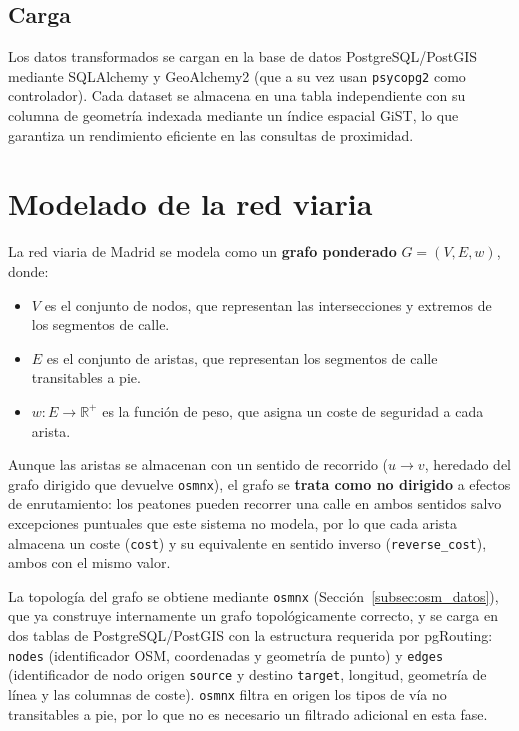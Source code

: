\subsection{Carga}
\label{subsec:carga}

Los datos transformados se cargan en la base de datos PostgreSQL/PostGIS mediante SQLAlchemy y GeoAlchemy2 (que a su vez usan \texttt{psycopg2} como controlador). Cada dataset se almacena en una tabla independiente con su columna de geometría indexada mediante un índice espacial GiST, lo que garantiza un rendimiento eficiente en las consultas de proximidad.

\section{Modelado de la red viaria}
\label{sec:modelado_red}

La red viaria de Madrid se modela como un \textbf{grafo ponderado} $G = (V, E, w)$, donde:

\begin{itemize}
    \item $V$ es el conjunto de nodos, que representan las intersecciones y extremos de los segmentos de calle.
    \item $E$ es el conjunto de aristas, que representan los segmentos de calle transitables a pie.
    \item $w: E \rightarrow \mathbb{R}^+$ es la función de peso, que asigna un coste de seguridad a cada arista.
\end{itemize}

Aunque las aristas se almacenan con un sentido de recorrido ($u \rightarrow v$, heredado del grafo dirigido que devuelve \texttt{osmnx}), el grafo se \textbf{trata como no dirigido} a efectos de enrutamiento: los peatones pueden recorrer una calle en ambos sentidos salvo excepciones puntuales que este sistema no modela, por lo que cada arista almacena un coste (\texttt{cost}) y su equivalente en sentido inverso (\texttt{reverse\_cost}), ambos con el mismo valor.

La topología del grafo se obtiene mediante \texttt{osmnx} (Sección~\ref{subsec:osm_datos}), que ya construye internamente un grafo topológicamente correcto, y se carga en dos tablas de PostgreSQL/PostGIS con la estructura requerida por pgRouting: \texttt{nodes} (identificador OSM, coordenadas y geometría de punto) y \texttt{edges} (identificador de nodo origen \texttt{source} y destino \texttt{target}, longitud, geometría de línea y las columnas de coste). \texttt{osmnx} filtra en origen los tipos de vía no transitables a pie, por lo que no es necesario un filtrado adicional en esta fase.

